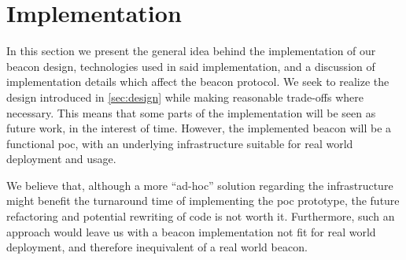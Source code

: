 \section{Implementation}%
\label{sec:implementation}

In this section we present the general idea behind the implementation of our beacon design, technologies used in said implementation, and a discussion of implementation details which affect the beacon protocol.
We seek to realize the design introduced in \cref{sec:design} while making reasonable trade-offs where necessary.
This means that some parts of the implementation will be seen as future work, in the interest of time.
However, the implemented beacon will be a functional \gls{poc}, with an underlying infrastructure suitable for real world deployment and usage.

We believe that, although a more \enquote{ad-hoc} solution regarding the infrastructure might benefit the turnaround time of implementing the \gls{poc} prototype, the future refactoring and potential rewriting of code is not worth it.
Furthermore, such an approach would leave us with a beacon implementation not fit for real world deployment, and therefore inequivalent of a real world beacon.

